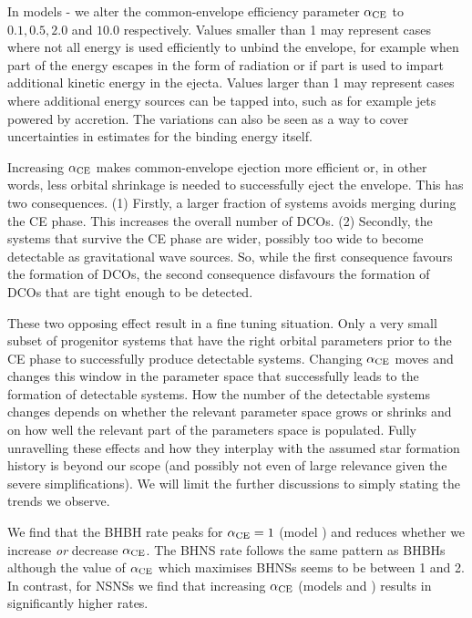 In models \modAlphaLowest{}-\modAlphaHighest{} we alter the common-envelope efficiency parameter $\alpha_{\rm CE}$ to $0.1, 0.5, 2.0$ and $10.0$ respectively. Values smaller than 1 may represent cases where not all energy is used efficiently to unbind the envelope, for example when part of the energy escapes in the form of radiation or if part is used to impart additional kinetic energy in the ejecta. Values larger than 1 may represent cases where additional energy sources can be tapped into, such as for example jets powered by accretion. The variations can also be seen as a way to cover uncertainties in estimates for the binding energy itself.  

Increasing $\alpha_{\rm CE}$ makes common-envelope ejection more efficient or, in other words, less orbital shrinkage is needed to successfully eject the envelope. This has two consequences. (1) Firstly, a larger fraction of systems avoids merging during the CE phase. This increases the overall number of DCOs. (2) Secondly, the systems that survive the CE phase are wider, possibly too wide to become detectable as gravitational wave sources. So, while the first consequence favours the formation of DCOs, the second consequence disfavours the formation of DCOs that are tight enough to be detected.

These two opposing effect result in a fine tuning situation. Only a very small subset of progenitor systems that have the right orbital parameters prior to the CE phase to successfully produce detectable systems. Changing  $\alpha_{\rm CE}$ moves and changes this window in the parameter space that successfully leads to the formation of detectable systems. How the number of the detectable systems changes depends on whether the relevant parameter space grows or shrinks and on how well the relevant part of the parameters space is populated. Fully unravelling these effects and how they interplay with the assumed star formation history is beyond our scope (and possibly not even of large relevance given the severe simplifications). We will limit the further discussions to simply stating the trends we observe.

We find that the BHBH rate peaks for $\alpha_{\rm CE} = 1$ (model \modFid{}) and reduces whether we increase \textit{or} decrease $\alpha_{\rm CE}$. The BHNS rate follows the same pattern as BHBHs although the value of $\alpha_{\rm CE}$ which maximises BHNSs seems to be between 1 and 2. In contrast, for NSNSs we find that increasing $\alpha_{\rm CE}$ (models \modAlphaHigh{} and \modAlphaHighest{}) results in significantly higher rates. 

